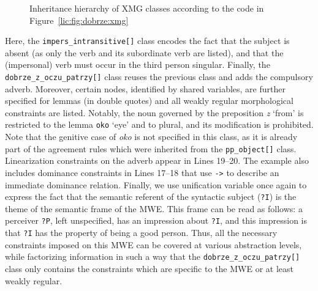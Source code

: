 \documentclass[output=paper]{langsci/langscibook}
\begin{document}
\begin{figure}[t]
  \centering
  \setlength{\tabcolsep}{2mm}
  \caption{Inheritance hierarchy of XMG classes according to the code in Figure~\ref{lic:fig:dobrze:xmg}}
  \label{lic:fig:dobrze:xmg:hierarchy}
\end{figure}
Here, the \texttt{impers\_intransitive[]} class encodes the fact that the subject is absent (as only the verb  and its subordinate verb are listed), and that the (impersonal) verb must occur in the third person singular. Finally, the \texttt{dobrze\_z\_oczu\_patrzy[]} class reuses the previous class and adds the compulsory adverb. Moreover, certain  nodes, identified by shared variables, are further specified for lemmas (in double quotes) and all weakly regular morphological constraints are listed. Notably, the noun governed by the preposition \textit{z} `from' is restricted to the lemma \texttt{oko} `eye' and to plural, and its modification is prohibited. Note that the genitive case of \textit{oko} is not specified in this class, as it is already part of the agreement rules which were inherited from the \texttt{pp\_object[]} class. Linearization constraints on the adverb appear in Lines 19--20. The example also includes dominance constraints in Lines 17--18 that use \texttt{->} to describe an immediate dominance relation. Finally, we use unification variable once again to express the fact that the semantic referent of the syntactic subject (\texttt{?I}) is the theme of the semantic frame of the MWE. This frame can be read as follows: a perceiver \texttt{?P}, left unspecified, has an impression about \texttt{?I}, and this impression is that \texttt{?I} has the property of being a good person. Thus, all the necessary constraints imposed on this MWE can be covered at various abstraction levels, while factorizing information in such a way that the \texttt{dobrze\_z\_oczu\_patrzy[]} class only contains the constraints which are specific to the MWE or at least weakly regular.
\end{document}
